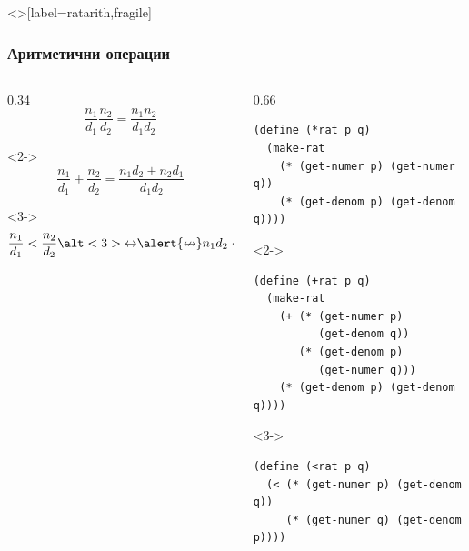 \documentclass[alsotrans,beameroptions={aspectratio=169}]{beamerswitch}
\begin{document}
\begin{frame}<>[label=ratarith,fragile]
  \frametitle{Аритметични операции}

  \sizeboth\footnotesize
  \begin{columns}[T,onlytextwidth]
    \begin{column}{0.34\textwidth}
      \vspace{4ex}
      \begin{equation*}
        \frac{n_1}{d_1}\frac{n_2}{d_2} = \frac{n_1n_2}{d_1d_2}
      \end{equation*}
      \vspace{8ex}
      \begin{uncoverenv}<2->
        \begin{equation*}
          \frac{n_1}{d_1} + \frac{n_2}{d_2} = \frac{n_1d_2 + n_2d_1}{d_1d_2}
        \end{equation*}
      \end{uncoverenv}
      \vspace{8ex}
      \begin{uncoverenv}<3->
        \begin{equation*}
          \frac{n_1}{d_1} < \frac{n_2}{d_2} \alt<3>{\leftrightarrow}{\alert{\nleftrightarrow}} n_1d_2 < n_2d_1
        \end{equation*}
      \end{uncoverenv}
    \end{column}

    \begin{column}{0.66\textwidth}
\begin{lstlisting}
(define (*rat p q)
  (make-rat
    (* (get-numer p) (get-numer q))
    (* (get-denom p) (get-denom q))))
\end{lstlisting}
      \begin{uncoverenv}<2->
\begin{lstlisting}
(define (+rat p q)
  (make-rat
    (+ (* (get-numer p)
          (get-denom q))
       (* (get-denom p)
          (get-numer q)))
    (* (get-denom p) (get-denom q))))
\end{lstlisting}
      \end{uncoverenv}
      \begin{uncoverenv}<3->
\begin{lstlisting}
(define (<rat p q)
  (< (* (get-numer p) (get-denom q))
     (* (get-numer q) (get-denom p))))
\end{lstlisting}
      \end{uncoverenv}
    \end{column}
  \end{columns}
\end{frame}
\end{document}
